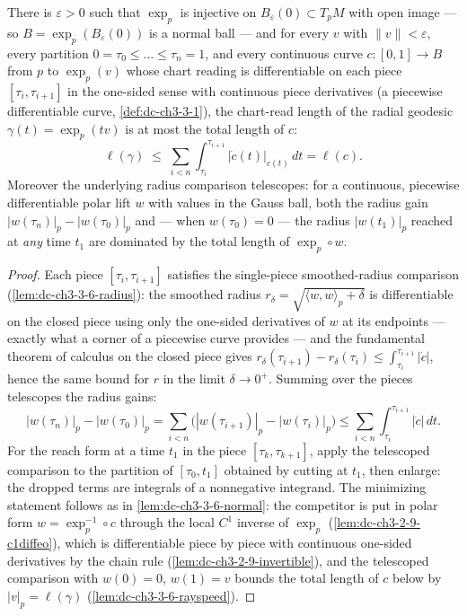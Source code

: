 \begin{lemma}
  \label{lem:dc-ch3-3-6-piecewise}
  \leanok
  There is $\varepsilon>0$ such that $\exp_p$ is injective on
  $B_\varepsilon(0)\subset T_pM$ with open image — so
  $B=\exp_p(B_\varepsilon(0))$ is a normal ball — and for every $v$ with
  $\|v\|<\varepsilon$, every partition $0=\tau_0\le\dots\le\tau_n=1$, and
  every continuous curve $c:[0,1]\to B$ from $p$ to $\exp_p(v)$ whose chart
  reading is differentiable on each piece $[\tau_i,\tau_{i+1}]$ in the
  one-sided sense with continuous piece derivatives (a piecewise
  differentiable curve, \cref{def:dc-ch3-3-1}), the chart-read length of the
  radial geodesic $\gamma(t)=\exp_p(tv)$ is at most the total length of $c$:
  $$\ell(\gamma)\;\le\;\sum_{i<n}\int_{\tau_i}^{\tau_{i+1}}
    \big|\dot c(t)\big|_{c(t)}\,dt=\ell(c).$$
  Moreover the underlying radius comparison telescopes: for a continuous,
  piecewise differentiable polar lift $w$ with values in the Gauss ball, both
  the radius gain $|w(\tau_n)|_p-|w(\tau_0)|_p$ and — when $w(\tau_0)=0$ —
  the radius $|w(t_1)|_p$ reached at \emph{any} time $t_1$ are dominated by
  the total length of $\exp_p\circ w$.
\end{lemma}
\begin{proof}
  \sketch
  \leanok
  Each piece $[\tau_i,\tau_{i+1}]$ satisfies the single-piece smoothed-radius
  comparison (\cref{lem:dc-ch3-3-6-radius}): the smoothed radius
  $r_\delta=\sqrt{\langle w,w\rangle_p+\delta}$ is differentiable on the
  closed piece using only the one-sided derivatives of $w$ at its endpoints —
  exactly what a corner of a piecewise curve provides — and the fundamental
  theorem of calculus on the closed piece gives
  $r_\delta(\tau_{i+1})-r_\delta(\tau_i)\le\int_{\tau_i}^{\tau_{i+1}}|\dot c|$,
  hence the same bound for $r$ in the limit $\delta\to0^+$. Summing over the
  pieces telescopes the radius gains:
  $$|w(\tau_n)|_p-|w(\tau_0)|_p
    =\sum_{i<n}\big(|w(\tau_{i+1})|_p-|w(\tau_i)|_p\big)
    \le\sum_{i<n}\int_{\tau_i}^{\tau_{i+1}}|\dot c|\,dt.$$
  For the reach form at a time $t_1$ in the piece $[\tau_k,\tau_{k+1}]$, apply
  the telescoped comparison to the partition of $[\tau_0,t_1]$ obtained by
  cutting at $t_1$, then enlarge: the dropped terms are integrals of a
  nonnegative integrand. The minimizing statement follows as in
  \cref{lem:dc-ch3-3-6-normal}: the competitor is put in polar form
  $w=\exp_p^{-1}\circ c$ through the local $C^1$ inverse of $\exp_p$
  (\cref{lem:dc-ch3-2-9-c1diffeo}), which is differentiable piece by piece
  with continuous one-sided derivatives by the chain rule
  (\cref{lem:dc-ch3-2-9-invertible}), and the telescoped comparison with
  $w(0)=0$, $w(1)=v$ bounds the total length of $c$ below by
  $|v|_p=\ell(\gamma)$ (\cref{lem:dc-ch3-3-6-rayspeed}).
\end{proof}

